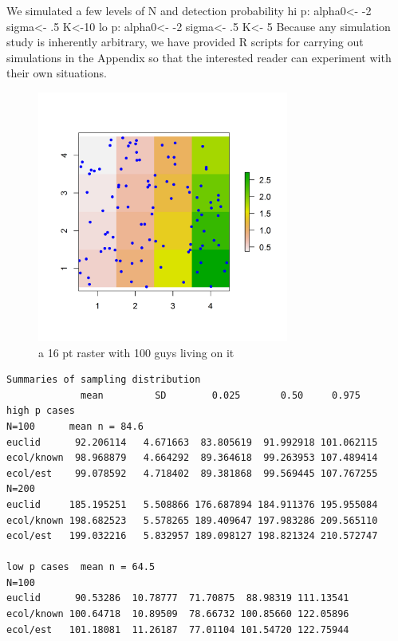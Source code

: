 We simulated a few levels of N and detection probability 
hi p: alpha0<- -2     sigma<- .5    K<-10
lo p: alpha0<- -2     sigma<- .5    K<- 5
Because any simulation study is inherently arbitrary, we have provided R scripts
for carrying out simulations in the Appendix so that the interested reader can experiment with
their own situations.

\begin{figure}
\begin{center}
\includegraphics[height=3.25in,width=3.25in]{Ch10/figs/raster_withN100}
\end{center}
\caption{a 16 pt raster with 100 guys living on it}
\label{ecoldist.fig.raster100}
\end{figure}
 


\begin{verbatim}
Summaries of sampling distribution
             mean         SD        0.025       0.50     0.975
high p cases  
N=100      mean n = 84.6
euclid      92.206114   4.671663  83.805619  91.992918 101.062115 
ecol/known  98.968879   4.664292  89.364618  99.263953 107.489414 
ecol/est    99.078592   4.718402  89.381868  99.569445 107.767255 
N=200
euclid     185.195251   5.508866 176.687894 184.911376 195.955084 
ecol/known 198.682523   5.578265 189.409647 197.983286 209.565110 
ecol/est   199.032216   5.832957 189.098127 198.821324 210.572747 

low p cases  mean n = 64.5 
N=100
euclid      90.53286  10.78777  71.70875  88.98319 111.13541 
ecol/known 100.64718  10.89509  78.66732 100.85660 122.05896 
ecol/est   101.18081  11.26187  77.01104 101.54720 122.75944 

\end{verbatim}

